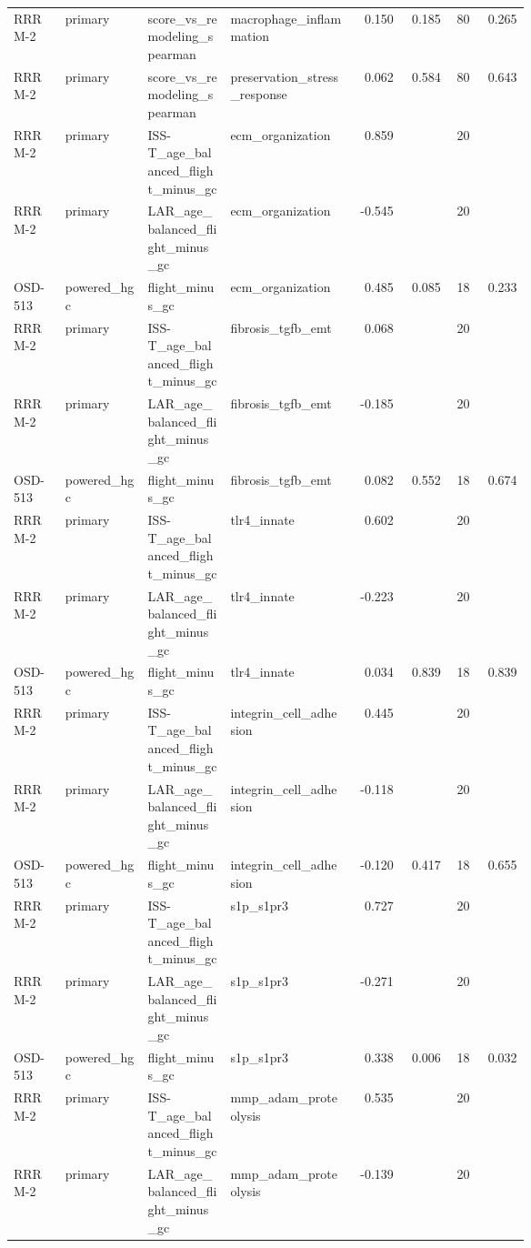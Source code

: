 \documentclass[11pt]{article}
\begin{document}
\begin{landscape}
\begin{longtable}{p{0.10\linewidth}p{0.16\linewidth}p{0.16\linewidth}p{0.24\linewidth}rrrr}
RRRM-2 & primary & score\_vs\_remodeling\_spearman & macrophage\_inflammation & 0.150 & 0.185 & 80 & 0.265 \\
RRRM-2 & primary & score\_vs\_remodeling\_spearman & preservation\_stress\_response & 0.062 & 0.584 & 80 & 0.643 \\
RRRM-2 & primary & ISS-T\_age\_balanced\_flight\_minus\_gc & ecm\_organization & 0.859 &  & 20 &  \\
RRRM-2 & primary & LAR\_age\_balanced\_flight\_minus\_gc & ecm\_organization & -0.545 &  & 20 &  \\
OSD-513 & powered\_hgc & flight\_minus\_gc & ecm\_organization & 0.485 & 0.085 & 18 & 0.233 \\
RRRM-2 & primary & ISS-T\_age\_balanced\_flight\_minus\_gc & fibrosis\_tgfb\_emt & 0.068 &  & 20 &  \\
RRRM-2 & primary & LAR\_age\_balanced\_flight\_minus\_gc & fibrosis\_tgfb\_emt & -0.185 &  & 20 &  \\
OSD-513 & powered\_hgc & flight\_minus\_gc & fibrosis\_tgfb\_emt & 0.082 & 0.552 & 18 & 0.674 \\
RRRM-2 & primary & ISS-T\_age\_balanced\_flight\_minus\_gc & tlr4\_innate & 0.602 &  & 20 &  \\
RRRM-2 & primary & LAR\_age\_balanced\_flight\_minus\_gc & tlr4\_innate & -0.223 &  & 20 &  \\
OSD-513 & powered\_hgc & flight\_minus\_gc & tlr4\_innate & 0.034 & 0.839 & 18 & 0.839 \\
RRRM-2 & primary & ISS-T\_age\_balanced\_flight\_minus\_gc & integrin\_cell\_adhesion & 0.445 &  & 20 &  \\
RRRM-2 & primary & LAR\_age\_balanced\_flight\_minus\_gc & integrin\_cell\_adhesion & -0.118 &  & 20 &  \\
OSD-513 & powered\_hgc & flight\_minus\_gc & integrin\_cell\_adhesion & -0.120 & 0.417 & 18 & 0.655 \\
RRRM-2 & primary & ISS-T\_age\_balanced\_flight\_minus\_gc & s1p\_s1pr3 & 0.727 &  & 20 &  \\
RRRM-2 & primary & LAR\_age\_balanced\_flight\_minus\_gc & s1p\_s1pr3 & -0.271 &  & 20 &  \\
OSD-513 & powered\_hgc & flight\_minus\_gc & s1p\_s1pr3 & 0.338 & 0.006 & 18 & 0.032 \\
RRRM-2 & primary & ISS-T\_age\_balanced\_flight\_minus\_gc & mmp\_adam\_proteolysis & 0.535 &  & 20 &  \\
RRRM-2 & primary & LAR\_age\_balanced\_flight\_minus\_gc & mmp\_adam\_proteolysis & -0.139 &  & 20 &  \\

\end{longtable}
\end{landscape}
\end{document}
